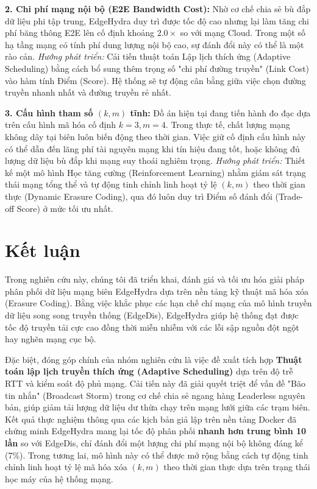 \documentclass[11pt,a4paper]{article}
\begin{document}
\textbf{2. Chi phí mạng nội bộ (E2E Bandwidth Cost):}
Nhờ cơ chế chia sẻ bù đắp dữ liệu phi tập trung, EdgeHydra duy trì được tốc độ cao nhưng lại làm tăng chi phí băng thông E2E lên cố định khoảng $2.0\times$ so với mạng Cloud. Trong một số hạ tầng mạng có tính phí dung lượng nội bộ cao, sự đánh đổi này có thể là một rào cản.
\textit{Hướng phát triển:} Cải tiến thuật toán Lập lịch thích ứng (Adaptive Scheduling) bằng cách bổ sung thêm trọng số "chi phí đường truyền" (Link Cost) vào hàm tính Điểm (Score). Hệ thống sẽ tự động cân bằng giữa việc chọn đường truyền nhanh nhất và đường truyền rẻ nhất.

\textbf{3. Cấu hình tham số $(k, m)$ tĩnh:}
Đồ án hiện tại đang tiến hành đo đạc dựa trên cấu hình mã hóa cố định $k=3, m=4$. Trong thực tế, chất lượng mạng không dây tại biên luôn biến động theo thời gian. Việc giữ cố định cấu hình này có thể dẫn đến lãng phí tài nguyên mạng khi tín hiệu đang tốt, hoặc không đủ lượng dữ liệu bù đắp khi mạng suy thoái nghiêm trọng.
\textit{Hướng phát triển:} Thiết kế một mô hình Học tăng cường (Reinforcement Learning) nhằm giám sát trạng thái mạng tổng thể và tự động tinh chỉnh linh hoạt tỷ lệ $(k, m)$ theo thời gian thực (Dynamic Erasure Coding), qua đó luôn duy trì Điểm số đánh đổi (Trade-off Score) ở mức tối ưu nhất.

\section{Kết luận}

Trong nghiên cứu này, chúng tôi đã triển khai, đánh giá và tối ưu hóa giải pháp phân phối dữ liệu mạng biên EdgeHydra dựa trên nền tảng kỹ thuật mã hóa xóa (Erasure Coding). Bằng việc khắc phục các hạn chế chí mạng của mô hình truyền dữ liệu song song truyền thống (EdgeDis), EdgeHydra giúp hệ thống đạt được tốc độ truyền tải cực cao đồng thời miễn nhiễm với các lỗi sập nguồn đột ngột hay nghẽn mạng cục bộ.

Đặc biệt, đóng góp chính của nhóm nghiên cứu là việc đề xuất tích hợp \textbf{Thuật toán lập lịch truyền thích ứng (Adaptive Scheduling)} dựa trên độ trễ RTT và kiểm soát độ phủ mạng. Cải tiến này đã giải quyết triệt để vấn đề "Bão tin nhắn" (Broadcast Storm) trong cơ chế chia sẻ ngang hàng Leaderless nguyên bản, giúp giảm tải lượng dữ liệu dư thừa chạy trên mạng lưới giữa các trạm biên. Kết quả thực nghiệm thông qua các kịch bản giả lập trên nền tảng Docker đã chứng minh EdgeHydra mang lại tốc độ phân phối \textbf{nhanh hơn trung bình 10 lần} so với EdgeDis, chỉ đánh đổi một lượng chi phí mạng nội bộ không đáng kể (7\%). Trong tương lai, mô hình này có thể được mở rộng bằng cách tự động tinh chỉnh linh hoạt tỷ lệ mã hóa xóa $(k, m)$ theo thời gian thực dựa trên trạng thái học máy của hệ thống mạng.
\end{document}
